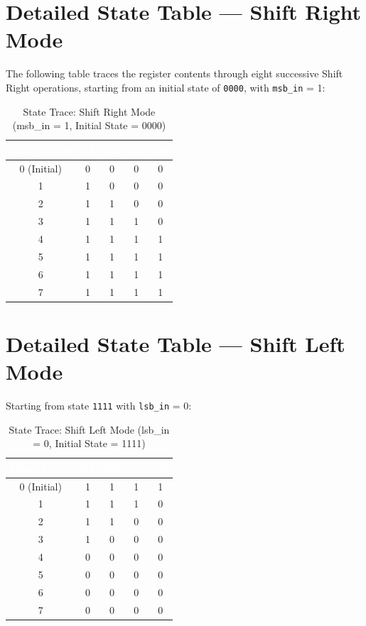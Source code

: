 \documentclass[12pt,a4paper]{report}
\newcommand{\signal}[1]{\texttt{\textcolor{codeblue}{#1}}}
\begin{document}
\section{Detailed State Table — Shift Right Mode}

The following table traces the register contents through eight successive Shift Right operations, starting from an initial state of \texttt{0000}, with \signal{msb\_in} = 1:

\begin{table}[H]
\centering
\caption{State Trace: Shift Right Mode (msb\_in = 1, Initial State = 0000)}
\renewcommand{\arraystretch}{1.3}
\begin{tabular}{ccccc}
    \toprule
    \rowcolor{tableheader}
    \textcolor{white}{\textbf{Clock Cycle}} &
    \textcolor{white}{\textbf{Q3}} &
    \textcolor{white}{\textbf{Q2}} &
    \textcolor{white}{\textbf{Q1}} &
    \textcolor{white}{\textbf{Q0}} \\
    \midrule
    0 (Initial) & 0 & 0 & 0 & 0 \\
    1 & 1 & 0 & 0 & 0 \\
    2 & 1 & 1 & 0 & 0 \\
    3 & 1 & 1 & 1 & 0 \\
    4 & 1 & 1 & 1 & 1 \\
    5 & 1 & 1 & 1 & 1 \\
    6 & 1 & 1 & 1 & 1 \\
    7 & 1 & 1 & 1 & 1 \\
    \bottomrule
\end{tabular}
\label{tab:shiftright}
\end{table}

\section{Detailed State Table — Shift Left Mode}

Starting from state \texttt{1111} with \signal{lsb\_in} = 0:

\begin{table}[H]
\centering
\caption{State Trace: Shift Left Mode (lsb\_in = 0, Initial State = 1111)}
\renewcommand{\arraystretch}{1.3}
\begin{tabular}{ccccc}
    \toprule
    \rowcolor{tableheader}
    \textcolor{white}{\textbf{Clock Cycle}} &
    \textcolor{white}{\textbf{Q3}} &
    \textcolor{white}{\textbf{Q2}} &
    \textcolor{white}{\textbf{Q1}} &
    \textcolor{white}{\textbf{Q0}} \\
    \midrule
    0 (Initial) & 1 & 1 & 1 & 1 \\
    1 & 1 & 1 & 1 & 0 \\
    2 & 1 & 1 & 0 & 0 \\
    3 & 1 & 0 & 0 & 0 \\
    4 & 0 & 0 & 0 & 0 \\
    5 & 0 & 0 & 0 & 0 \\
    6 & 0 & 0 & 0 & 0 \\
    7 & 0 & 0 & 0 & 0 \\
    \bottomrule
\end{tabular}
\label{tab:shiftleft}
\end{table}
\end{document}
